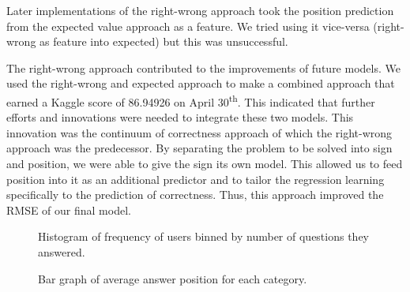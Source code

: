 \documentclass[letterpaper]{article}
\begin{document}
Later implementations of the right-wrong approach took the position prediction from the expected value approach as a feature. We tried using it vice-versa (right-wrong as feature into expected) but this was unsuccessful.

The right-wrong approach contributed to the improvements of future models. We used the right-wrong and expected approach to make a combined approach that earned a Kaggle score of 86.94926 on April 30\textsuperscript{th}. This indicated that further efforts and innovations were needed to integrate these two models. This innovation was the continuum of correctness approach of which the right-wrong approach was the predecessor. By separating the problem to be solved into sign and position, we were able to give the sign its own model. This allowed us to feed position into it as an additional predictor and to tailor the regression learning specifically to the prediction of correctness. Thus, this approach improved the RMSE of our final model.



\begin{figure}[H]
	\begin{center}
	\end{center}
	\caption{Histogram of frequency of users binned by number of questions they answered.}
	\label{fig:userHisto}
\end{figure}

\begin{figure}[H]
	\begin{center}
	\end{center}
	\caption{Bar graph of average answer position for each category.}
	\label{fig:categoryAverages}
\end{figure}
\end{document}

